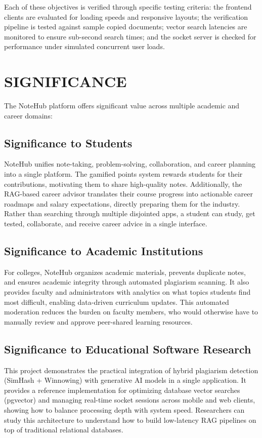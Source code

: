 \documentclass[12,Times new Roman,a4paper]{report}
\begin{document}
Each of these objectives is verified through specific testing criteria: the frontend clients are evaluated for loading speeds and responsive layouts; the verification pipeline is tested against sample copied documents; vector search latencies are monitored to ensure sub-second search times; and the socket server is checked for performance under simulated concurrent user loads.

\section{SIGNIFICANCE}

The NoteHub platform offers significant value across multiple academic and career domains:

\subsection{Significance to Students}
NoteHub unifies note-taking, problem-solving, collaboration, and career planning into a single platform. The gamified points system rewards students for their contributions, motivating them to share high-quality notes. Additionally, the RAG-based career advisor translates their course progress into actionable career roadmaps and salary expectations, directly preparing them for the industry. Rather than searching through multiple disjointed apps, a student can study, get tested, collaborate, and receive career advice in a single interface.

\subsection{Significance to Academic Institutions}
For colleges, NoteHub organizes academic materials, prevents duplicate notes, and ensures academic integrity through automated plagiarism scanning. It also provides faculty and administrators with analytics on what topics students find most difficult, enabling data-driven curriculum updates. This automated moderation reduces the burden on faculty members, who would otherwise have to manually review and approve peer-shared learning resources.

\subsection{Significance to Educational Software Research}
This project demonstrates the practical integration of hybrid plagiarism detection (SimHash + Winnowing) with generative AI models in a single application. It provides a reference implementation for optimizing database vector searches (pgvector) and managing real-time socket sessions across mobile and web clients, showing how to balance processing depth with system speed. Researchers can study this architecture to understand how to build low-latency RAG pipelines on top of traditional relational databases.
\end{document}
